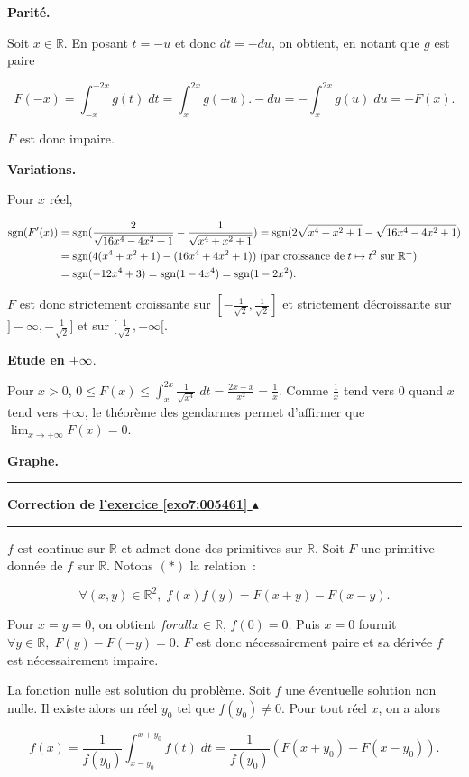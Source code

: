 \documentclass[11pt,a4paper]{article}
\newcommand{\Rr}{\mathbb{R}} \newcommand{\R}{\mathbb{R}}
\newcounter{exo}
\newcommand{\correction}[1]{\hypertarget{cor7:#1}{}\label{cor7:#1}{\bf Correction de \hyperlink{exo7:#1}{l'exercice \ref{exo7:#1} $\blacktriangle$}}\vspace{1mm}\hrule\vspace{1mm}}
\newcommand{\fincorrection}{\vspace{1mm}\hrule\vspace*{7mm}}
\begin{document}
\textbf{Parité.}

Soit $x\in\Rr$. En posant $t=-u$ et donc $dt=-du$, on obtient, en notant que $g$ est paire

$$F(-x)=\int_{-x}^{-2x}g(t)\;dt=\int_{x}^{2x}g(-u).-du=-\int_{x}^{2x}g(u)\;du=-F(x).$$

$F$ est donc impaire.

\textbf{Variations.}

Pour $x$ réel,

\begin{align*}\ensuremath
\mbox{sgn}(F'(x))&=\mbox{sgn}(\frac{2}{\sqrt{16x^4-4x^2+1}}-\frac{1}{\sqrt{x^4+x^2+1}})=\mbox{sgn}(2\sqrt{x^4+x^2+1}-\sqrt{16x^4-4x^2+1})\\
 &=\mbox{sgn}(4(x^4+x^2+1)-(16x^4+4x^2+1))\;(\mbox{par croissance de}\;t\mapsto t^2\;\mbox{sur}\;\Rr^+)\\
  &=\mbox{sgn}(-12x^4+3)=\mbox{sgn}(1-4x^4)=\mbox{sgn}(1-2x^2).
\end{align*}

$F$ est donc strictement croissante sur $[-\frac{1}{\sqrt{2}},\frac{1}{\sqrt{2}}]$ et strictement décroissante sur $]-\infty,-\frac{1}{\sqrt{2}}]$ et sur $[\frac{1}{\sqrt{2}},+\infty[$.

\textbf{Etude en} $\bf{+{\infty}}$.

Pour $x>0$, $0\leq F(x)\leq\int_{x}^{2x}\frac{1}{\sqrt{x^4}}\;dt=\frac{2x-x}{x^2}=\frac{1}{x}$. Comme $\frac{1}{x}$ tend vers $0$ quand $x$ tend vers $+\infty$, le théorème des gendarmes permet d'affirmer que $\lim_{x\rightarrow +\infty}F(x)=0$.

\textbf{Graphe.}


\fincorrection
\correction{005461}
$f$ est continue sur $\Rr$ et admet donc des primitives sur $\Rr$. Soit $F$ une primitive donnée de $f$ sur $\Rr$. Notons $(*)$ la relation~:

$$\forall(x,y)\in\Rr^2,\;f(x)f(y)=F(x+y)-F(x-y).$$

Pour $x=y=0$, on obtient $forall x\in\Rr$, $f(0)=0$. Puis $x=0$ fournit $\forall y\in\Rr,\;F(y)-F(-y)=0$. $F$ est donc nécessairement paire et sa dérivée $f$ est nécessairement impaire.

La fonction nulle est solution du problème. Soit $f$ une éventuelle solution non nulle. Il existe alors un réel $y_0$ tel que $f(y_0)\neq0$. Pour tout réel $x$, on a alors 

$$f(x)=\frac{1}{f(y_0)}\int_{x-y_0}^{x+y_0}f(t)\;dt=\frac{1}{f(y_0)}(F(x+y_0)-F(x-y_0)).$$
\end{document}
